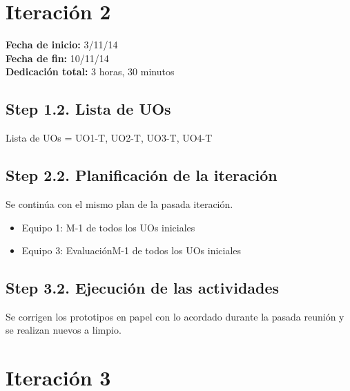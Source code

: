 
\section{Iteración 2}
\label{it2}

\begin{flushleft}
\textbf{Fecha de inicio:} 3/11/14\\
\textbf{Fecha de fin:} 10/11/14\\
\textbf{Dedicación total:} 3 horas, 30 minutos\\
\end{flushleft}

\subsection{Step 1.2. Lista de UOs}
\label{it2:1.2}

Lista de UOs = {UO1-T, UO2-T, UO3-T, UO4-T}

\subsection{Step 2.2. Planificación de la iteración}
\label{it2:2.2}

Se continúa con el mismo plan de la pasada iteración.

\begin{itemize}
\item Equipo 1: M-1 de todos los UOs iniciales
\item Equipo 3: Evaluación{M-1 de todos los UOs iniciales}
\end{itemize}

\subsection{Step 3.2. Ejecución de las actividades}
\label{it2:3.2}

Se corrigen los prototipos en papel con lo acordado durante la pasada reunión y se realizan nuevos a limpio.\\


\section{Iteración 3}
\label{it3}

